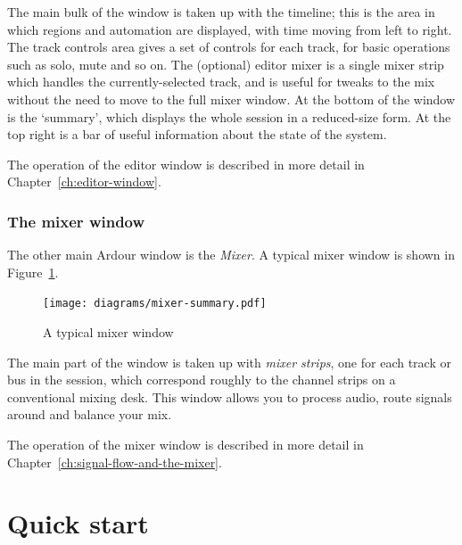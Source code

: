 \documentclass[10pt,a4paper]{book}
\begin{document}
The main bulk of the window is taken up with the timeline; this is the
area in which regions and automation are displayed, with time moving
from left to right.  The track controls area gives a set of controls
for each track, for basic operations such as solo, mute and so on.
The (optional) editor mixer is a single mixer strip which handles the
currently-selected track, and is useful for tweaks to the mix without
the need to move to the full mixer window.  At the bottom of the
window is the `summary', which displays the whole session in a
reduced-size form.  At the top right is a bar of useful information
about the state of the system.

The operation of the editor window is described in more detail in
Chapter~\ref{ch:editor-window}.

\subsection{The mixer window}

The other main Ardour window is the \emph{Mixer}.  A typical mixer
window is shown in Figure~\ref{fig:typical-mixer}.

\begin{figure}[ht]
\begin{center}
\texttt{[image: diagrams/mixer-summary.pdf]}
\end{center}
\caption{A typical mixer window}
\label{fig:typical-mixer}
\end{figure}

The main part of the window is taken up with \emph{mixer strips}, one
for each track or bus in the session, which correspond roughly to the
channel strips on a conventional mixing desk.  This window allows you
to process audio, route signals around and balance your mix.

The operation of the mixer window is described in more detail in
Chapter~\ref{ch:signal-flow-and-the-mixer}.







\chapter{Quick start}
\end{document}
